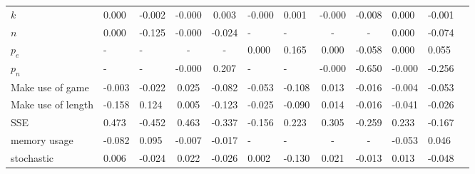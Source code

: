 \begin{tabular}{lggccggccggg}
$k$                  &  0.000 & -0.002 &  -0.000 &   0.003 &  -0.000 &   0.001 &  -0.000 &  -0.008 &  0.000 &  -0.001 \\
$n$                  &  0.000 & -0.125 &  -0.000 &  -0.024 &       - &       - &       - &       - &  0.000 &  -0.074 \\
$p_e$                &      - &      - &        - &     - &    0.000 &   0.165 &   0.000 &  -0.058 &  0.000 &   0.055 \\
$p_n$                &      - &      - &  -0.000 &   0.207 &       - &       - &  -0.000 &  -0.650 & -0.000 &  -0.256 \\
Make use of game     & -0.003 & -0.022 &   0.025 &  -0.082 &  -0.053 &  -0.108 &   0.013 &  -0.016 & -0.004 &  -0.053 \\
Make use of length   & -0.158 &  0.124 &   0.005 &  -0.123 &  -0.025 &  -0.090 &   0.014 &  -0.016 & -0.041 &  -0.026 \\
SSE                  &  0.473 & -0.452 &   0.463 &  -0.337 &  -0.156 &   0.223 &   0.305 &  -0.259 &  0.233 &  -0.167 \\
memory usage         & -0.082 &  0.095 &  -0.007 &  -0.017 &       - &     - &     - &           - & -0.053 &   0.046 \\
stochastic           &  0.006 & -0.024 &   0.022 &  -0.026 &   0.002 &  -0.130 &   0.021 &  -0.013 &  0.013 &  -0.048 \\
\bottomrule
\end{tabular}
